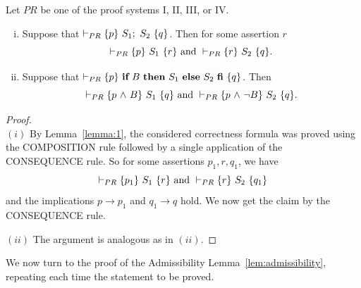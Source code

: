 \documentclass[manuscript, screen, review]{acmart}
\begin{document}
\begin{lemma} \label{lem:useful}
Let $\mathit{PR}$ be one of the proof systems I, II, III, or IV.
  \begin{enumerate} [(i)] 
  \item  Suppose that  $\vdash_{PR} \HT{p}{S_1; \ S_2}{q}$.
    Then for some assertion $r$
    \[
 \vdash_{PR} \mbox{$\{{p}\}\ {S_1}\ \{{r}\}$} \mbox{ and }
 \vdash_{PR} \mbox{$\{{r}\}\ {S_2}\ \{{q}\}$}.
\]

\item Suppose that  $\vdash_{PR} \mbox{$\{{p}\}\ {\mbox{$\mbox{{\bf if}\ } {B} \mbox{\ {\bf then}\ } {S_1} \mbox{\ {\bf else}\ } {S_2}\ \mbox{{\bf fi}}$}}\ \{{q}\}$}$.
    Then 
    \[
 \vdash_{PR} \mbox{$\{{p \mbox{$\ \wedge\ $} B}\}\ {S_1}\ \{{q}\}$} \mbox{ and }
 \vdash_{PR} \mbox{$\{{p \mbox{$\ \wedge\ $} \neg B}\}\ {S_2}\ \{{q}\}$}.
\]
 \end{enumerate}    
\end{lemma}
\begin{proof}
  \mbox{} \\
  $(i)$ By Lemma~\ref{lemma:1}, the considered correctness formula was proved using
  the COMPOSITION rule followed by a single application of the CONSEQUENCE rule.
  So for some assertions $p_1, r, q_1$, we have
    \[
 \vdash_{PR} \mbox{$\{{p_1}\}\ {S_1}\ \{{r}\}$} \mbox{ and }
 \vdash_{PR} \mbox{$\{{r}\}\ {S_2}\ \{{q_1}\}$}
\]
and the implications $p \to p_1$ and $q_1 \to q$ hold.
We now get the claim by the CONSEQUENCE rule.
\III

\NI
$(ii)$ The argument is analogous as in $(ii)$. 
\end{proof}

We now turn to the proof of the Admissibility Lemma~\ref{lem:admissibility}, 
repeating each time the statement to be proved.
\end{document}
